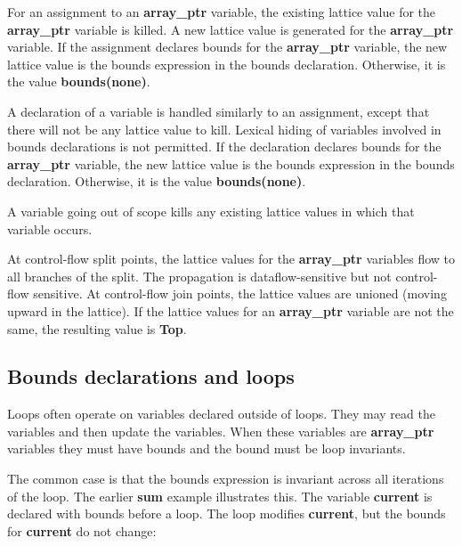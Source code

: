 \documentclass[]{article}
\begin{document}
For an assignment to an \textbf{array\_ptr} variable, the existing
lattice value for the \textbf{array\_ptr} variable is killed. A new
lattice value is generated for the \textbf{array\_ptr} variable. If the
assignment declares bounds for the \textbf{array\_ptr} variable, the new
lattice value is the bounds expression in the bounds declaration.
Otherwise, it is the value \textbf{bounds(none)}.

A declaration of a variable is handled similarly to an assignment,
except that there will not be any lattice value to kill. Lexical hiding
of variables involved in bounds declarations is not permitted. If the
declaration declares bounds for the \textbf{array\_ptr} variable, the
new lattice value is the bounds expression in the bounds declaration.
Otherwise, it is the value \textbf{bounds(none)}.

A variable going out of scope kills any existing lattice values in which
that variable occurs.

At control-flow split points, the lattice values for the
\textbf{array\_ptr} variables flow to all branches of the split. The
propagation is dataflow-sensitive but not control-flow sensitive. At
control-flow join points, the lattice values are unioned (moving upward
in the lattice). If the lattice values for an \textbf{array\_ptr}
variable are not the same, the resulting value is \textbf{Top}.

\subsection{\texorpdfstring{\protect\hypertarget{ux5fToc426641076}{}{\protect\hypertarget{ux5fToc435434943}{}{\protect\hypertarget{ux5fToc437460769}{}{\protect\hypertarget{ux5fToc440445447}{}{\protect\hypertarget{ux5fToc440449229}{}{\protect\hypertarget{ux5fToc440551879}{}{\protect\hypertarget{ux5fToc426641079}{}{}}}}}}}Bounds
declarations and
loops}{Bounds declarations and loops}}\label{bounds-declarations-and-loops}

Loops often operate on variables declared outside of loops. They may
read the variables and then update the variables. When these variables
are \textbf{array\_ptr} variables they must have bounds and the bound
must be loop invariants.

The common case is that the bounds expression is invariant across all
iterations of the loop. The earlier \textbf{sum} example illustrates
this. The variable \textbf{current} is declared with bounds before a
loop. The loop modifies \textbf{current}, but the bounds for
\textbf{current} do not change:
\end{document}
